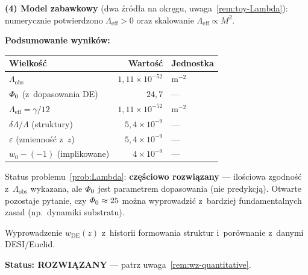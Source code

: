 \begin{remark}
\medskip\noindent
\textbf{(4) Model zabawkowy} (dwa \'zr\'od\l{}a na okr\k{e}gu,
uwaga~\ref{rem:toy-Lambda}): numerycznie potwierdzono
$\Lambda_{\mathrm{eff}} > 0$ oraz skalowanie
$\Lambda_{\mathrm{eff}} \propto M^2$.

\medskip\noindent
\textbf{Podsumowanie wynik\'ow:}
\begin{center}
\begin{tabular}{lrl}
\hline
Wielko\'s\'c & Warto\'s\'c & Jednostka \\
\hline
$\Lambda_{\mathrm{obs}}$ & $1{,}11 \times 10^{-52}$ & $\mathrm{m}^{-2}$ \\
$\varPhi_0$ (z~dopasowania DE) & $24{,}7$ & --- \\
$\Lambda_{\mathrm{eff}} = \gamma/12$ & $1{,}11 \times 10^{-52}$ & $\mathrm{m}^{-2}$ \\
$\delta\Lambda/\Lambda$ (struktury) & $5{,}4 \times 10^{-9}$ & --- \\
$\varepsilon$ (zmienno\'s\'c z~$z$) & $5{,}4 \times 10^{-9}$ & --- \\
$w_0 - (-1)$ (implikowane) & $4 \times 10^{-9}$ & --- \\
\hline
\end{tabular}
\end{center}

Status problemu~\ref{prob:Lambda}:
\textbf{cz\k{e}\'sciowo rozwi\k{a}zany} --- ilo\'sciowa
zgodno\'s\'c z~$\Lambda_{\mathrm{obs}}$ wykazana, ale
$\varPhi_0$ jest parametrem dopasowania (nie predykcj\k{a}).
Otwarte pozostaje pytanie, czy $\varPhi_0 \approx 25$ mo\.zna
wyprowadzi\'c z~bardziej fundamentalnych zasad (np.\ dynamiki
substratu).
\end{remark}

\begin{problem}\label{prob:wz}
Wyprowadzenie $w_{\mathrm{DE}}(z)$ z~historii formowania
struktur i~por\'ownanie z~danymi DESI/Euclid.

\textbf{Status: ROZWI\k{A}ZANY} --- patrz uwaga~\ref{rem:wz-quantitative}.
\end{problem}

